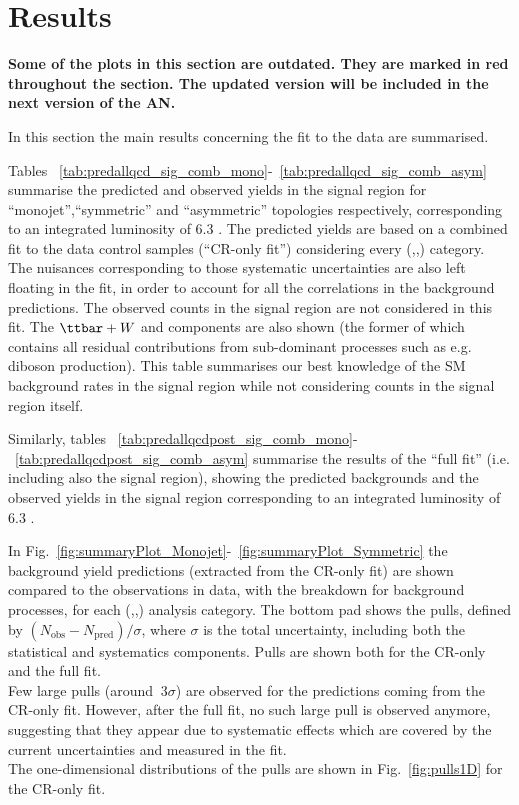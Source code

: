 \section{Results}
\label{sec:results}
\textbf{Some of the plots in this section are outdated. They are marked in red throughout the section. The updated version will be included in the next version of the AN.}

In this section the main results concerning the fit to the data are summarised. 

Tables ~\ref{tab:predallqcd_sig_comb_mono}-~\ref{tab:predallqcd_sig_comb_asym} summarise 
the predicted and observed yields in the signal region 
for ``monojet'',``symmetric'' and ``asymmetric'' topologies respectively, 
corresponding to an integrated luminosity of 6.3 \ifb. 
The predicted yields are based on a combined fit to the data control samples (``CR-only fit'') considering every (\nj,\nb,\scalht) category. 
The nuisances corresponding to those systematic uncertainties are also left floating in the fit, 
in order to account for all the correlations in the background predictions. 
The observed counts in the signal region are not considered in this fit. 
The $\ttbar+W$ and \znunu components are also shown (the former of which contains all residual contributions from sub-dominant processes such as e.g. diboson production). 
This table summarises our best knowledge of the SM background rates in the signal region while not considering counts in the signal region itself. 

Similarly, tables ~\ref{tab:predallqcdpost_sig_comb_mono}-~\ref{tab:predallqcdpost_sig_comb_asym} summarise the results of the ``full fit'' (i.e. including also the signal region), showing the predicted backgrounds and the observed yields in the signal region corresponding to an integrated luminosity of 6.3 \ifb.

In Fig.~\ref{fig:summaryPlot_Monojet}-~\ref{fig:summaryPlot_Symmetric} the background yield predictions (extracted from the CR-only fit)
are shown compared to the observations in data, with the breakdown for background processes, for each (\njet,\nb,\scalht) analysis category. 
The bottom pad shows the pulls, defined by $(N_{\mathrm{obs}}-N_{\mathrm{pred}})/\sigma$, where $\sigma$ is the total uncertainty, 
including both the statistical and systematics components. Pulls are shown both for the CR-only and the full fit. \\
Few large pulls (around $~3\sigma$) are observed for the predictions coming from the CR-only fit. 
However, after the full fit, no such large pull is observed anymore, suggesting that 
they appear due to systematic effects which are covered by the current uncertainties and measured in the fit. \\
The one-dimensional distributions of the pulls are shown in Fig.~\ref{fig:pulls1D} for the CR-only fit.

